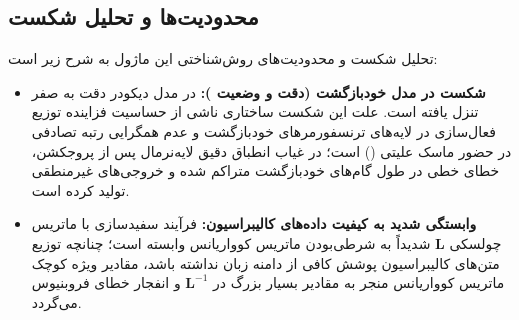 \subsection{محدودیت‌ها و تحلیل شکست}
تحلیل شکست و محدودیت‌های روش‌شناختی این ماژول به شرح زیر است:
\begin{itemize}
    \item \textbf{شکست در مدل خودبازگشت  (دقت  و وضعیت ):} در مدل دیکودر  دقت به صفر تنزل یافته است. علت این شکست ساختاری ناشی از حساسیت فزاینده توزیع فعال‌سازی در لایه‌های  ترنسفورمرهای خودبازگشت و عدم همگرایی رتبه تصادفی در حضور ماسک علیتی () است؛ در غیاب انطباق دقیق لایه‌نرمال پس از پروجکشن، خطای خطی در طول گام‌های خودبازگشت متراکم شده و خروجی‌های غیرمنطقی تولید کرده است.
    \item \textbf{وابستگی شدید به کیفیت داده‌های کالیبراسیون:} فرآیند سفیدسازی با ماتریس چولسکی $\mathbf{L}$ شدیداً به شرطی‌بودن ماتریس کوواریانس وابسته است؛ چنانچه توزیع متن‌های کالیبراسیون پوشش کافی از دامنه زبان نداشته باشد، مقادیر ویژه کوچک ماتریس کوواریانس منجر به مقادیر بسیار بزرگ در $\mathbf{L}^{-1}$ و انفجار خطای فروبنیوس می‌گردد.
\end{itemize}
